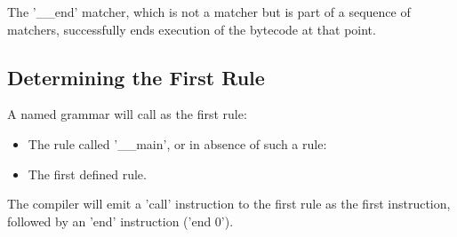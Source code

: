The '\_\_end' matcher, which is not a matcher but is part of a sequence
of matchers, successfully ends execution of the bytecode at that point.

\subsection{Determining the First Rule}

A named grammar will call as the first rule:

\begin{itemize}
\item The rule called '\_\_main', or in absence of such a rule:
\item The first defined rule.
\end{itemize}

The compiler will emit a 'call' instruction to the first rule as the
first instruction, followed by an 'end' instruction ('end 0').
